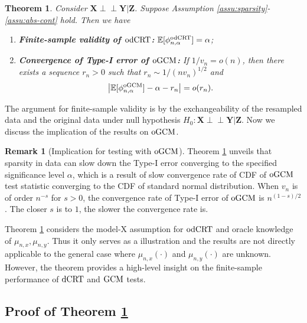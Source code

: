 \documentclass[12pt]{article}
\newtheorem{theorem}{Theorem}
\theoremstyle{definition}
\newtheorem{remark}{Remark}
\newcommand{\indep}{\perp \!\!\! \perp}
\newcommand{\E}{\mathbb E}								%
\newcommand{\prx}{\bm X}								%
\newcommand{\prz}{\bm Z}								%
\newcommand{\pry}{{\bm Y}}								%
\newcommand{\dCRT}{\textnormal{dCRT}} 					%
\newcommand{\odCRT}{\textnormal{odCRT}} 					%
\newcommand{\GCM}{\textnormal{GCM}}						%
\newcommand{\oGCM}{\textnormal{oGCM}}						%
\begin{document}
\begin{theorem}\label{thm:illustrative}
  Consider $\prx\indep\pry|\prz$. Suppose Assumption \ref{assu:sparsity}-\ref{assu:abs-cont} hold. Then we have
  \begin{enumerate}
    \item \textbf{Finite-sample validity of $\odCRT$:} $\E[\phi_{n,\alpha}^{\odCRT}]=\alpha$;
    \item \textbf{Convergence of Type-I error of $\oGCM$:} If $1/v_n=o(n)$, then there exists a sequence $r_n>0$ such that $r_n\sim 1/(nv_n)^{1/2}$ and
    \begin{align}\label{eq:illustrative-convergence}
      \left|\E[\phi_{n,\alpha}^{\oGCM}]-\alpha-r_n\right|=o(r_n).
    \end{align}
  \end{enumerate}
\end{theorem}
The argument for finite-sample validity is by the exchangeability of the resampled data and the original data under null hypothesis $H_0:\prx\indep\pry|\prz$. Now we discuss the implication of the results on $\oGCM$.
\begin{remark}[Implication for testing with $\oGCM$]
	Theorem \ref{thm:illustrative} unveils that sparsity in data can slow down the Type-I error converging to the specified significance level $\alpha$, which is a result of slow convergence rate of CDF of $\oGCM$ test statistic converging to the CDF of standard normal distribution. When $v_n$ is of order $n^{-s}$ for $s>0$, the convergence rate of Type-I error of $\oGCM$ is $n^{(1-s)/2}$. The closer $s$ is to $1$, the slower the convergence rate is. 
\end{remark}

Theorem \ref{thm:illustrative} considers the model-X assumption for $\odCRT$ and oracle knowledge of $\mu_{n,x},\mu_{n,y}$. Thus it only serves as a illustration and the results are not directly applicable to the general case where $\mu_{n,x}(\cdot)$ and $\mu_{n,y}(\cdot)$ are unknown. However, the theorem provides a high-level insight on the finite-sample performance of $\dCRT$ and $\GCM$ tests. 


\subsection{Proof of Theorem \ref{thm:illustrative}}
\end{document}
